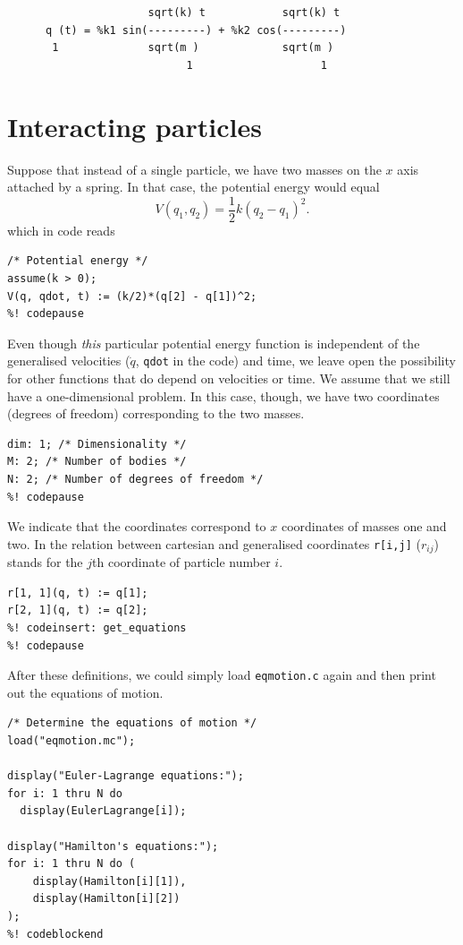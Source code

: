 \documentclass{article}
\begin{document}
\begin{minipage}{\textwidth}
\begin{verbatim}
                      sqrt(k) t            sqrt(k) t
      q (t) = %k1 sin(---------) + %k2 cos(---------)
       1              sqrt(m )             sqrt(m )
                            1                    1
\end{verbatim}
\end{minipage}

\section{Interacting particles}

Suppose that instead of a single particle, we have two masses on the $x$ axis
attached by a spring. In that case, the potential energy would equal
\begin{equation*}
  V(q_1, q_2) = \frac{1}{2} k (q_2 - q_1)^2.
\end{equation*}
which in code reads
\begin{lstlisting}[frame=single]
%! codefile: two_springs.mc
/* Potential energy */
assume(k > 0);
V(q, qdot, t) := (k/2)*(q[2] - q[1])^2;
%! codepause
\end{lstlisting}
Even though \textit{this} particular potential energy function is independent of
the generalised velocities ($\dot{q}$, \texttt{qdot} in the code) and time, we
leave open the possibility for other functions that do depend on velocities or
time. We assume that we still have a one-dimensional problem. In this case,
though, we have two coordinates (degrees of freedom) corresponding to the two
masses. \begin{lstlisting}[frame=single]
%! codecontinue: two_springs.mc
dim: 1; /* Dimensionality */
M: 2; /* Number of bodies */
N: 2; /* Number of degrees of freedom */
%! codepause
\end{lstlisting}
We indicate that the coordinates correspond to $x$ coordinates of masses one and
two. In the relation between cartesian and generalised coordinates
\texttt{r[i,j]} ($r_{ij}$) stands for the $j$th coordinate of particle number
$i$.
\begin{lstlisting}[frame=single]
%! codecontinue: two_springs.mc
r[1, 1](q, t) := q[1];
r[2, 1](q, t) := q[2];
%! codeinsert: get_equations
%! codepause
\end{lstlisting}
After these definitions, we could simply load \texttt{eqmotion.c} again and then
print out the equations of motion.
\begin{lstlisting}[frame=single]
%! codeblock: get_equations
/* Determine the equations of motion */
load("eqmotion.mc");

display("Euler-Lagrange equations:");
for i: 1 thru N do
  display(EulerLagrange[i]);

display("Hamilton's equations:");
for i: 1 thru N do (
    display(Hamilton[i][1]),
    display(Hamilton[i][2])
);
%! codeblockend
\end{lstlisting}
\end{document}
